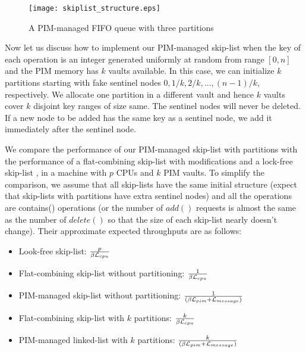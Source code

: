 \begin{figure}[ht!]
\centering
\texttt{[image: skiplist\_structure.eps]}
\caption{A PIM-managed FIFO queue with three partitions}
\label{figure:skiplist_structure}
\end{figure}

Now let us discuss how to implement our PIM-managed skip-list
when the key of each operation is an integer generated uniformly at random
from range $[0, n]$ and the PIM memory has $k$ vaults available.
In this case, we can initialize $k$ partitions starting with fake sentinel nodes
$0, 1/k, 2/k,..., (n-1)/k$, respectively.
We allocate one partition in a different vault and hence $k$ vaults cover
$k$ disjoint key ranges of size same.
The sentinel nodes will never be deleted.
If a new node to be added has the same key as a sentinel node,
we add it immediately after the sentinel node.

We compare the performance of our PIM-managed skip-list with partitions 
with the performance of a flat-combining skip-list \cite{Hendler10} with modifications
and a lock-free skip-list \cite{Herlihy08}, 
in a machine with $p$ CPUs and $k$ PIM vaults.
To simplify the comparison, we assume that all skip-lists have the same
initial structure (expect that skip-lists with partitions have extra sentinel nodes)
and all the operations are contains() operations
(or the number of $add()$ requests is almost the same as the number of $delete()$ 
so that the size of each skip-list nearly doesn't change).
Their approximate expected throughputs are as follows:

\begin{itemize}
\item Look-free skip-list:
	${p \over \beta\mathcal{L}_{cpu}}$

\item Flat-combining skip-list without partitioning:
	${1 \over \beta\mathcal{L}_{cpu}}$

\item PIM-managed skip-list without partitioning:
	${1 \over (\beta\mathcal{L}_{pim} + \mathcal{L}_{message})}$

\item Flat-combining skip-list with $k$ partitions:
    ${k \over \beta\mathcal{L}_{cpu}}$

\item PIM-managed linked-list with $k$ partitions:
    ${k \over (\beta\mathcal{L}_{pim} + \mathcal{L}_{message})}$
\end{itemize}

